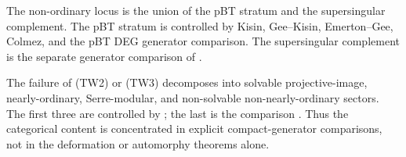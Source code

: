 The non-ordinary locus is the union of the pBT stratum and the
supersingular complement. The pBT stratum is controlled by Kisin,
Gee--Kisin, Emerton--Gee, Colmez, and the pBT DEG generator comparison.
The supersingular complement is the separate generator comparison of
.

The failure of (TW2) or (TW3) decomposes into solvable projective-image,
nearly-ordinary, Serre-modular, and non-solvable non-nearly-ordinary
sectors. The first three are controlled by
; the last is the comparison
. Thus the categorical
content is concentrated in explicit compact-generator comparisons, not
in the deformation or automorphy theorems alone.
